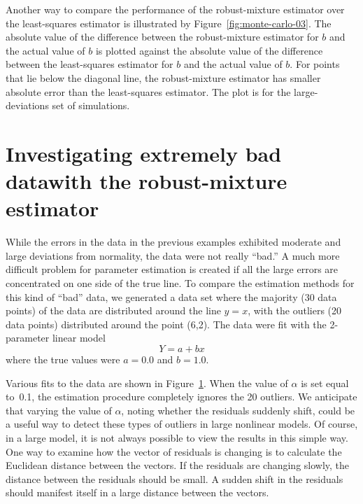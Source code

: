 \documentclass{admbmanual}
\begin{document}
Another way to compare the performance of the robust-mixture 
estimator over the least-squares estimator is illustrated 
by Figure~\ref{fig:monte-carlo-03}. %
The absolute value of the difference between the robust-mixture estimator 
for $b$ and the actual value of $b$ is plotted against the
absolute value of the difference between the least-squares estimator for
$b$ and the actual value of $b$. For points that lie below the
diagonal line, the robust-mixture estimator has smaller absolute error
 than the least-squares estimator.
The plot is for the large-deviations set of simulations.


\section{Investigating extremely bad data\br with the robust-mixture
estimator}
\label{sec:investigating-bad-data}

While the errors in the data in the previous examples exhibited moderate and
large deviations from normality, the data were not really ``bad.''
A much more difficult problem for parameter estimation is created if
all the large errors are concentrated on one side of the true
line. 
To compare the estimation methods for this kind of ``bad'' data,
we generated a data set where the majority
(30 data points) of the data are distributed around the line $y=x$,
with the outliers (20 data points) distributed around the point (6,2).
The data were fit with the 2-parameter linear model
\begin{equation*}
  Y=a+bx
\end{equation*}
where the true values were $a=0.0$ and $b=1.0$.

Various fits to the data are shown in Figure~\ref{fig:robust-nonlinear-regression-03}. %
When the value of $\alpha$ is set equal to~0.1, the estimation procedure
completely ignores the 20 outliers. We anticipate that varying
the value of $\alpha$, noting whether the residuals suddenly shift,
could be a useful way to detect these types of outliers in large
nonlinear models. Of course, in a large model,
it is not always possible to view the results in this simple way.
One way to examine how the vector of residuals is changing is to calculate 
the Euclidean distance between the vectors. If the residuals are
changing slowly, the distance between the residuals should be small.
A sudden shift in the residuals should manifest itself in a large
distance between the vectors. 
\begin{figure}
  \centering\hskip1pt
   
   \emptycaption{}
   \label{fig:robust-nonlinear-regression-03}
\end{figure}
\end{document}
